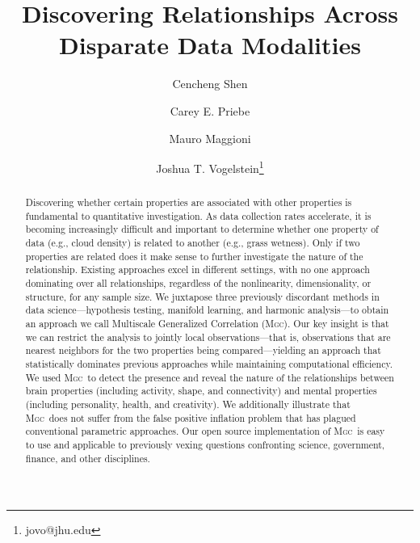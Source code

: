 \documentclass[11pt]{article}
\providecommand{\sct}[1]{{\normalfont\textsc{#1}}}
\newcommand{\Mgc}{\sct{Mgc}}
\begin{document}
\def\spacingset#1{\renewcommand{\baselinestretch}%
{#1}\small\normalsize} \spacingset{1}
\title{\vspace{-2em}\bf Discovering Relationships Across Disparate Data Modalities}

\author[1,2]{Cencheng Shen} %
\author[1,3]{Carey E. Priebe}%
\author[3,4,6]{Mauro Maggioni}%
\author[1,5,6]{Joshua T. Vogelstein\thanks{jovo@jhu.edu}}
\maketitle 
\thispagestyle{empty}
\date{}
\vspace{-15pt}
\begin{abstract}
Discovering whether certain properties are associated with other properties is fundamental to quantitative investigation. As data collection rates accelerate, it is becoming increasingly difficult and important to determine whether one property of data (e.g., cloud density) is related to another (e.g., grass wetness). Only if two properties are related does it make sense to further investigate the nature of the relationship. 
Existing approaches excel in different settings, with no one approach dominating over all relationships, regardless of the nonlinearity, dimensionality, or structure, for any sample size.
We juxtapose three previously discordant methods in data science---hypothesis testing, manifold learning, and harmonic analysis---to obtain an approach we call Multiscale Generalized Correlation (\Mgc). 
Our key insight is that we can restrict the analysis to jointly local observations---that is, observations that are nearest neighbors for the two properties being compared---yielding an approach that statistically dominates previous approaches while maintaining computational efficiency.
We used \Mgc~to detect the presence and reveal the nature of the relationships between brain properties (including activity, shape, and connectivity) and mental properties (including personality, health, and creativity). We additionally illustrate that \Mgc~does not suffer from the false positive inflation problem that has plagued conventional parametric approaches. 
Our open source implementation of \Mgc~is easy to use and applicable to previously vexing questions confronting science, government, finance, and other disciplines. 
\end{abstract}
\end{document}
